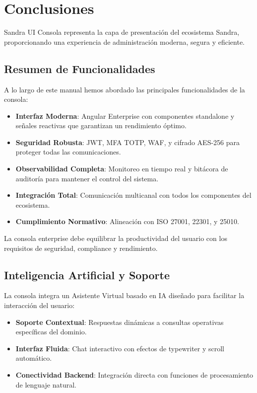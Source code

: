
\chapter{Conclusiones}

Sandra UI Consola representa la capa de presentación del ecosistema Sandra, proporcionando una experiencia de administración moderna, segura y eficiente.

\section{Resumen de Funcionalidades}

A lo largo de este manual hemos abordado las principales funcionalidades de la consola:

\begin{itemize}
\item \textbf{Interfaz Moderna}: Angular Enterprise con componentes standalone y señales reactivas que garantizan un rendimiento óptimo.
\item \textbf{Seguridad Robusta}: JWT, MFA TOTP, WAF, y cifrado AES-256 para proteger todas las comunicaciones.
\item \textbf{Observabilidad Completa}: Monitoreo en tiempo real y bitácora de auditoría para mantener el control del sistema.
\item \textbf{Integración Total}: Comunicación multicanal con todos los componentes del ecosistema.
    \item \textbf{Cumplimiento Normativo}: Alineación con ISO 27001, 22301, y 25010.
\end{itemize}

La consola enterprise debe equilibrar la productividad del usuario con los requisitos de seguridad, compliance y rendimiento.

\section{Inteligencia Artificial y Soporte}

La consola integra un Asistente Virtual basado en IA diseñado para facilitar la interacción del usuario:

\begin{itemize}
\item \textbf{Soporte Contextual}: Respuestas dinámicas a consultas operativas específicas del dominio.
    \item \textbf{Interfaz Fluida}: Chat interactivo con efectos de typewriter y scroll automático.
\item \textbf{Conectividad Backend}: Integración directa con funciones de procesamiento de lenguaje natural.
\end{itemize}


